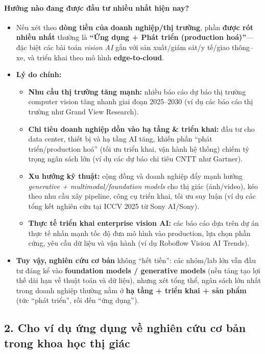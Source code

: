 \paragraph{Hướng nào đang được đầu tư nhiều nhất hiện nay?}
\begin{itemize}
  \item Nếu xét theo \textbf{dòng tiền của doanh nghiệp/thị trường}, phần \textbf{được rót nhiều nhất} thường là
  \textbf{``Ứng dụng + Phát triển (production hoá)''}---đặc biệt các bài toán \emph{vision AI} gắn với
  sản xuất/giám sát/y tế/giao thông--xe, và triển khai theo mô hình \textbf{edge-to-cloud}.

  \item \textbf{Lý do chính:}
  \begin{itemize}
    \item \textbf{Nhu cầu thị trường tăng mạnh:} nhiều báo cáo dự báo thị trường computer vision tăng nhanh giai đoạn 2025--2030
    (ví dụ các báo cáo thị trường như Grand View Research).
    \item \textbf{Chi tiêu doanh nghiệp dồn vào hạ tầng \& triển khai:} đầu tư cho data center, thiết bị và hạ tầng AI tăng,
    khiến phần ``phát triển/production hoá'' (tối ưu triển khai, vận hành hệ thống) chiếm tỷ trọng ngân sách lớn
    (ví dụ các dự báo chi tiêu CNTT như Gartner).
    \item \textbf{Xu hướng kỹ thuật:} cộng đồng và doanh nghiệp đẩy mạnh hướng \emph{generative + multimodal/foundation models}
    cho thị giác (ảnh/video), kéo theo nhu cầu xây pipeline, công cụ triển khai, tối ưu suy luận (ví dụ các tổng kết nghiên cứu
    tại ICCV 2025 từ Sony AI/Sony).
    \item \textbf{Thực tế triển khai enterprise vision AI:} các báo cáo dựa trên dự án thực tế nhấn mạnh tốc độ đưa mô hình vào
    production, lựa chọn phần cứng, yêu cầu dữ liệu và vận hành (ví dụ Roboflow Vision AI Trends).
  \end{itemize}

  \item \textbf{Tuy vậy,} \textbf{nghiên cứu cơ bản} không ``hết tiền'': các nhóm/lab lớn vẫn đầu tư đáng kể vào
  \textbf{foundation models / generative models} (nền tảng tạo lợi thế dài hạn về thuật toán và dữ liệu), nhưng xét tổng thể,
  ngân sách lớn nhất trong doanh nghiệp thường nằm ở \textbf{hạ tầng + triển khai + sản phẩm} (tức ``phát triển'', rồi đến ``ứng dụng'').
\end{itemize}

\subsection*{2. Cho ví dụ ứng dụng về nghiên cứu cơ bản trong khoa học thị giác}

